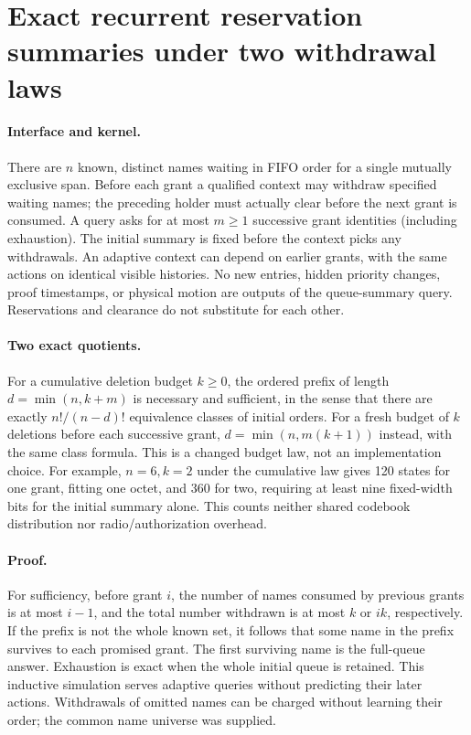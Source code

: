 \documentclass{article}
\begin{document}
\section*{Exact recurrent reservation summaries under two withdrawal laws}
\paragraph{Interface and kernel.}
There are \(n\) known, distinct names waiting in FIFO order for a single
mutually exclusive span. Before each grant a qualified context may
withdraw specified waiting names; the preceding holder must actually
clear before the next grant is consumed. A query asks for at most
\(m\ge1\) successive grant identities (including exhaustion).
The initial summary is fixed before the context picks any withdrawals.
An adaptive context can depend on earlier grants, with the same
actions on identical visible histories. No new entries, hidden
priority changes, proof timestamps, or physical motion are outputs
of the queue-summary query. Reservations and clearance do not
substitute for each other.

\paragraph{Two exact quotients.}
For a cumulative deletion budget \(k\ge0\), the ordered prefix of
length \(d=\min(n,k+m)\) is necessary and sufficient, in the sense
that there are exactly \(n!/(n-d)!\) equivalence classes of initial
orders. For a fresh budget of \(k\) deletions before each successive
grant, \(d=\min(n,m(k+1))\) instead, with the same class formula.
This is a changed budget law, not an implementation choice. For
example, \(n=6,k=2\) under the cumulative law gives 120 states for one
grant, fitting one octet, and 360 for two, requiring at least nine
fixed-width bits for the initial summary alone. This counts neither
shared codebook distribution nor radio/authorization overhead.

\paragraph{Proof.}
For sufficiency, before grant \(i\), the number of names consumed by
previous grants is at most \(i-1\), and the total number withdrawn
is at most \(k\) or \(ik\), respectively. If the prefix is not the
whole known set, it follows that some name in the prefix survives
to each promised grant. The first surviving name is the full-queue
answer. Exhaustion is exact when the whole initial queue is retained.
This inductive simulation serves adaptive queries without predicting
their later actions. Withdrawals of omitted names can be charged
without learning their order; the common name universe was supplied.
\end{document}
